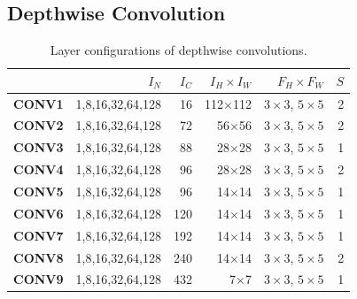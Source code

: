 %

\subsection{Depthwise Convolution}
\label{sec:depconvexp}

\begin{table}[]
\caption{Layer configurations of depthwise  convolutions.}
\vspace{-3mm}
\label{tab:depconvconfigs}
\centering
{}
\begin{threeparttable}
\begin{tabular}{lrrrrr}
\toprule
& \textbf{$I_N$} & \textbf{$I_C$} & \textbf{$I_H \times I_W$ }&  \textbf{$F_H \times F_W$} &\textbf{$S$}\\
\midrule
\textbf{CONV1} & 1,8,16,32,64,128  & 16    & 112$\times$112 & $3 \times 3$, $5 \times 5$&2  \\
\textbf{CONV2} & 1,8,16,32,64,128  & 72    & 56$\times$56  &$3 \times 3$, $5 \times 5$  &2 \\
\textbf{CONV3} & 1,8,16,32,64,128  & 88   & 28$\times$28  &$3 \times 3$, $5 \times 5$   &1 \\
\textbf{CONV4} & 1,8,16,32,64,128  & 96    & 28$\times$28  &$3 \times 3$, $5 \times 5$  &2  \\
\textbf{CONV5} & 1,8,16,32,64,128  & 96   & 14$\times$14  &$3 \times 3$, $5 \times 5$   &1 \\
\textbf{CONV6} & 1,8,16,32,64,128  & 120   & 14$\times$14  &$3 \times 3$, $5 \times 5$  &1  \\
\textbf{CONV7} & 1,8,16,32,64,128  & 192   & 14$\times$14  &$3 \times 3$, $5 \times 5$  &1  \\
\textbf{CONV8} & 1,8,16,32,64,128  & 240   & 14$\times$14  &$3 \times 3$, $5 \times 5$  &2  \\
\textbf{CONV9} & 1,8,16,32,64,128  & 432   & 7$\times$7  &$3 \times 3$, $5 \times 5$    &1\\

\bottomrule
\end{tabular}
\end{threeparttable}

\end{table}

